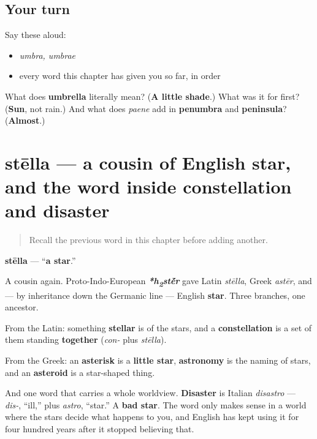 \subsection*{Your turn}
Say these aloud:

\begin{itemize}
\raggedright
  \item \emph{umbra, umbrae}
  \item every word this chapter has given you so far, in order
\end{itemize}

\begin{tcolorbox}[breakable,colback=teal!4,colframe=teal!35!black,title={Before you move on}]
What does \textbf{umbrella} literally mean? (\textbf{A little shade}.) What was it for first? (\textbf{Sun}, not rain.) And what does \emph{paene} add in \textbf{penumbra} and \textbf{peninsula}? (\textbf{Almost}.)
\end{tcolorbox}
\section[stēlla, stēllae]{stēlla — a cousin of English star, and the word inside constellation and disaster}

\label{lesson:LA-C46-stella}



\begin{quote}
Recall the previous word in this chapter before adding another.
\end{quote}

\begin{cousinweb}
\textbf{stēlla} — \textquotedblleft{}\textbf{a star}.\textquotedblright{}

A cousin again. Proto-Indo-European \emph{\textbf{*h\textsubscript{2}st\'{\={e}}r}} gave Latin \emph{stēlla}, Greek \emph{astēr}, and — by inheritance down the Germanic line — English \textbf{star}. Three branches, one ancestor.

From the Latin: something \textbf{stellar} is of the stars, and a \textbf{constellation} is a set of them standing \textbf{together} (\emph{con-} plus \emph{stēlla}).

From the Greek: an \textbf{asterisk} is a \textbf{little star}, \textbf{astronomy} is the naming of stars, and an \textbf{asteroid} is a star-shaped thing.

And one word that carries a whole worldview. \textbf{Disaster} is Italian \emph{disastro} — \emph{dis-}, \textquotedblleft{}ill,\textquotedblright{} plus \emph{astro}, \textquotedblleft{}star.\textquotedblright{} A \textbf{bad star}. The word only makes sense in a world where the stars decide what happens to you, and English has kept using it for four hundred years after it stopped believing that.
\end{cousinweb}

